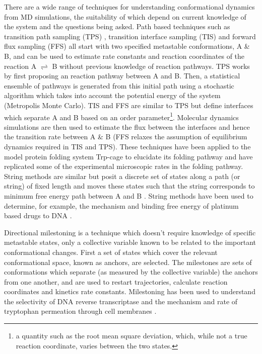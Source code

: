 There are a wide range of techniques for understanding conformational dynamics from MD simulations, the suitability of which depend on current knowledge of the system and the questions being asked. Path based techniques such as transition path sampling (TPS) \cite{bolhuisTRANSITIONPATHSAMPLING2002, dellagoTransitionPathSampling1998, dellagoTransitionPathSampling2002a}, transition interface sampling (TIS) \cite{vanerpNovelPathSampling2003} and forward flux sampling (FFS) 
\cite{allenSamplingRareSwitching2005} all start with two specified metastable conformations, A \& B, and can be used to estimate rate constants and reaction coordinates of the reaction A $\rightleftharpoons$ B without previous knowledge of reaction pathways. TPS works by first proposing an reaction pathway between A and B. Then, a statistical ensemble of pathways is generated from this initial path using a stochastic algorithm which takes into account the potential energy of the system (Metropolis Monte Carlo). TIS and FFS are similar to TPS but define interfaces which separate A and B based on an order parameter\footnote{a quantity such as the root mean square deviation, which, while not a true reaction coordinate, varies between the two states.}. Molecular dynamics simulations are then used to estimate the flux between the interfaces and hence the transition rate between A \& B (FFS relaxes the assumption of equilibrium dynamics required in TIS and TPS). These techniques have been applied \cite{juraszekSamplingMultipleFolding2006, juraszekRateConstantReaction2008,velez-vegaKineticsMechanismUnfolding2010} to the model protein folding system Trp-cage \cite{neidighDesigning20residueProtein2002} to elucidate its folding pathway and have replicated some of the experimental microscopic rates in the folding pathway. String methods are similar but posit a discrete set of states along a path (or string) of fixed length and moves these states such that the string corresponds to minimum free energy path between A and B \cite{weinane.TransitionPathTheoryPathFinding2010, jnssonNudgedElasticBand1998}. String methods have been used to determine, for example, the mechanism and binding free energy of platinum based drugs to DNA \cite{elderSequenceSpecificRecognitionCancer2012}. 

Directional milestoning \cite{faradjianComputingTimeScales2004, majekMilestoningReactionCoordinate2010,kirmizialtinRevisitingComputingReaction2011a} is a technique which doesn't require knowledge of specific metastable states, only a  collective variable known to be related to the important conformational changes.  First a set of states which cover the relevant conformational space, known as anchors, are selected. The milestones are sets of conformations which separate (as measured by the collective variable) the anchors from one another, and are used to restart trajectories, calculate reaction coordinates and kinetics rate constants. Milestoning has been used to understand the selectivity of DNA reverse transcriptase \cite{kirmizialtinHowConformationalDynamics2012} and the  mechanism and rate of tryptophan permeation through cell membranes \cite{cardenasUnassistedTransportAcetyl2012}.  

